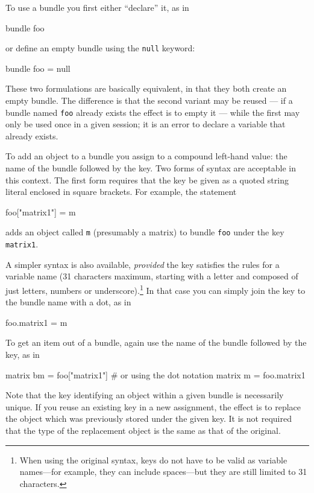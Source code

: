To use a bundle you first either ``declare'' it, as in
%
\begin{code}
bundle foo
\end{code}
%
or define an empty bundle using the \texttt{null} keyword:
%
\begin{code}
bundle foo = null
\end{code}
%
These two formulations are basically equivalent, in that they both
create an empty bundle. The difference is that the second variant
may be reused --- if a bundle named \texttt{foo} already exists the
effect is to empty it --- while the first may only be used once in
a given  session; it is an error to declare a variable that
already exists. 

To add an object to a bundle you assign to a compound left-hand value:
the name of the bundle followed by the key. Two forms of syntax are
acceptable in this context. The first form requires that the key be
given as a quoted string literal enclosed in square brackets.  For
example, the statement
\begin{code}
foo["matrix1"] = m
\end{code}
adds an object called \texttt{m} (presumably a matrix) to bundle
\texttt{foo} under the key \texttt{matrix1}. 

A simpler syntax is also available, \emph{provided} the key satisfies
the rules for a  variable name (31 characters maximum,
starting with a letter and composed of just letters, numbers or
underscore).\footnote{When using the original syntax, keys do not have
  to be valid as variable names---for example, they can include
  spaces---but they are still limited to 31 characters.}  In that case
you can simply join the key to the bundle name with a dot, as in

\begin{code}
foo.matrix1 = m
\end{code}

To get an item out of a bundle, again use the name of the bundle
followed by the key, as in

\begin{code}
matrix bm = foo["matrix1"]
# or using the dot notation
matrix m = foo.matrix1
\end{code}

Note that the key identifying an object within a given bundle is
necessarily unique. If you reuse an existing key in a new assignment,
the effect is to replace the object which was previously stored under
the given key. It is not required that the type of the replacement
object is the same as that of the original.

